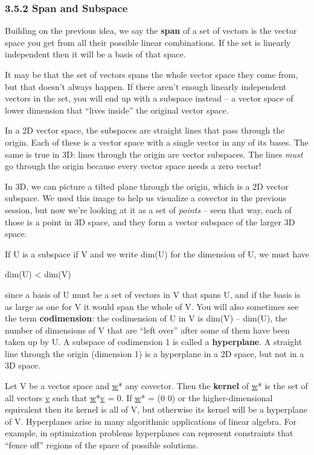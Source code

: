 \documentclass[oneside,english]{amsbook}
\numberwithin{section}{chapter}
\theoremstyle{plain}
\theoremstyle{definition}
\begin{document}
\subsubsection{3.5.2 Span and Subspace}\label{span-and-subspace}

Building on the previous idea, we say the \textbf{span} of a set of
vectors is the vector space you get from all their possible linear
combinations. If the set is linearly independent then it will be a basis
of that space.

It may be that the set of vectors spans the whole vector space they come
from, but that doesn't always happen. If there aren't enough linearly
independent vectors in the set, you will end up with a subspace instead
-- a vector space of lower dimension that ``lives inside'' the original
vector space.

In a 2D vector space, the subspaces are straight lines that pass through
the origin. Each of these is a vector space with a single vector in any
of its bases. The same is true in 3D: lines through the origin are
vector subspaces. The lines \emph{must} go through the origin because
every vector space needs a zero vector!

In 3D, we can picture a tilted plane through the origin, which is a 2D
vector subspace. We used this image to help us visualize a covector in
the previous session, but now we're looking at it as a set of
\emph{points} -- seen that way, each of those is a point in 3D space,
and they form a vector subspace of the larger 3D space.

If U is a subspace if V and we write dim(U) for the dimension of U, we
must have

dim(U) \textless{} dim(V)

since a basis of U must be a set of vectors in V that spans U, and if
the basis is as large as one for V it would span the whole of V. You
will also sometimes see the term \textbf{codimension}: the codimension
of U in V is dim(V) -- dim(U), the number of dimensions of V that are
``left over'' after some of them have been taken up by U. A subspace of
codimension 1 is called a \textbf{hyperplane}. A straight line through
the origin (dimension 1) is a hyperplane in a 2D space, but not in a 3D
space.

Let V be a vector space and \ul{w}* any covector. Then the
\textbf{kernel} of \ul{w}* is the set of all vectors \ul{v} such that
\ul{w}*\ul{v} = 0. If \ul{w}* = (0 0) or the higher-dimensional
equivalent then its kernel is all of V, but otherwise its kernel will be
a hyperplane of V. Hyperplanes arise in many algorithmic applications of
linear algebra. For example, in optimization problems hyperplanes can
represent constraints that ``fence off'' regions of the space of
possible solutions.
\end{document}
